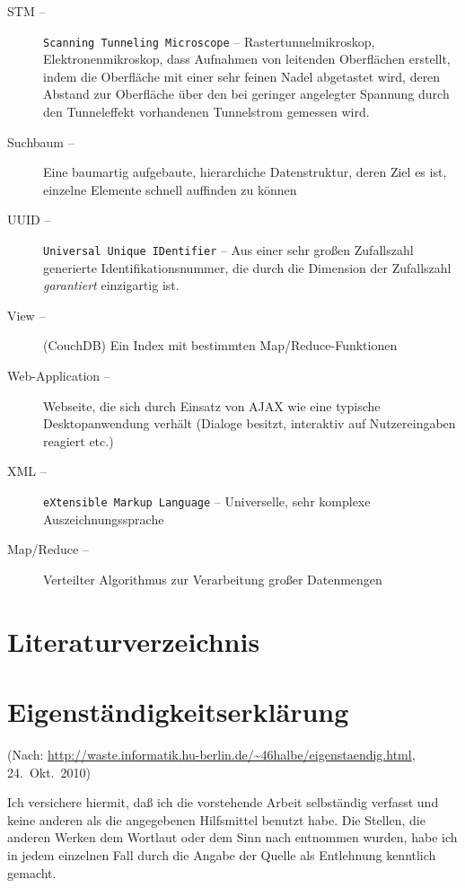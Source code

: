 \documentclass[12pt,ngerman,a4]{scrartcl}
\newcommand{\litem}[2]{\item[#1 --] #2}
\newcommand{\blitem}[3]{\item[#1 --] \texttt{#2} -- #3}
\begin{document}
\begin{description}
\blitem{STM}{Scanning Tunneling Microscope}{Rastertunnelmikroskop, Elektronenmikroskop, dass Aufnahmen von leitenden Oberflächen erstellt, indem die Oberfläche mit einer sehr feinen Nadel abgetastet wird, deren Abstand zur Oberfläche über den bei geringer angelegter Spannung durch den Tunneleffekt vorhandenen Tunnelstrom gemessen wird.}
\litem{Suchbaum}{Eine baumartig aufgebaute, hierarchiche Datenstruktur, deren Ziel es ist, einzelne Elemente schnell auffinden zu können\cite{aocpfa}}
\blitem{UUID}{Universal Unique IDentifier}{Aus einer sehr großen Zufallszahl generierte Identifikationsnummer, die durch die Dimension der Zufallszahl \emph{garantiert} einzigartig ist.}
\litem{View}{(CouchDB) Ein Index mit bestimmten Map/Reduce-Funktionen\cite{cdbw02}}
\litem{Web-Application}{Webseite, die sich durch Einsatz von AJAX wie eine typische Desktopanwendung verhält (Dialoge besitzt, interaktiv auf Nutzereingaben reagiert etc.)}
\blitem{XML}{eXtensible Markup Language}{Universelle, sehr komplexe Auszeichnungssprache}
\litem{Map/Reduce}{Verteilter Algorithmus zur Verarbeitung großer Datenmengen\cite{sawzall}}
\end{description}
\vspace*{3mm} %
\section{Literaturverzeichnis}
\vspace{-1.5cm}
\nocite{*}

\renewcommand{\refname}{}


\section{Eigenständigkeitserklärung}
{\scriptsize(Nach: \url{http://waste.informatik.hu-berlin.de/~46halbe/eigenstaendig.html}, 24.\ Okt.\ 2010)}

Ich versichere hiermit, daß ich die vorstehende Arbeit selbständig verfasst und keine anderen als die angegebenen Hilfsmittel benutzt habe. Die Stellen, die anderen Werken dem Wortlaut oder dem Sinn nach entnommen wurden, habe ich in jedem einzelnen Fall durch die Angabe der Quelle als Entlehnung kenntlich gemacht.
\end{document}
